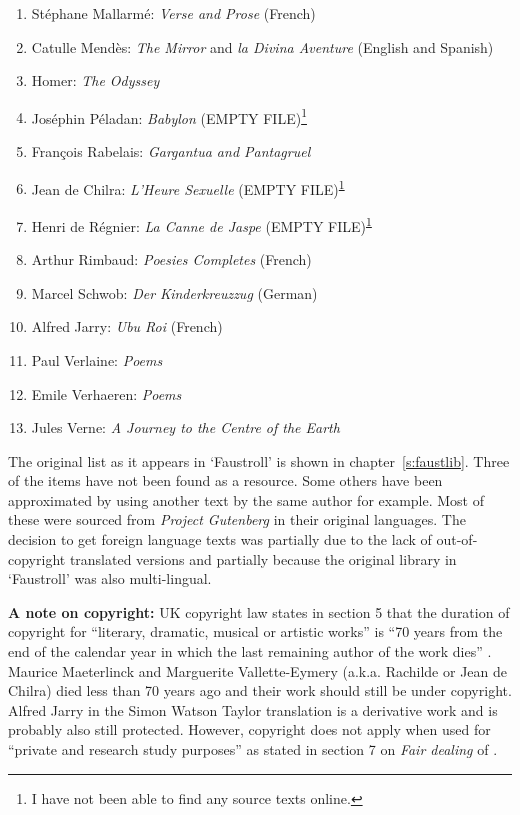 \begin{enumerate}[start=0]
\item St{\'e}phane Mallarm{\'e}: \textit{Verse and Prose} (French) \autocite*{Mallarme2003}
\item Catulle Mend{\`e}s: \textit{The Mirror} and \textit{la Divina Aventure} (English and Spanish) \autocite*{Mendes1910,Mendes2013}
\item Homer: \textit{The Odyssey} \autocite*{Homer1999}
\item Jos{\'e}phin P{\'e}ladan: \textit{Babylon} (EMPTY FILE)\footnote{I have not been able to find any source texts online.\label{emptyfile}}
\item Fran\c{c}ois Rabelais: \textit{Gargantua and Pantagruel} \autocite*{Rabelais2004}
\item Jean de Chilra: \textit{L'Heure Sexuelle} (EMPTY FILE)\textsuperscript{\ref{emptyfile}}
\item Henri de R{\'e}gnier: \textit{La Canne de Jaspe} (EMPTY FILE)\textsuperscript{\ref{emptyfile}}
\item Arthur Rimbaud: \textit{Poesies Completes} (French) \autocite*{Rimbaud2009}
\item Marcel Schwob: \textit{Der Kinderkreuzzug} (German) \autocite*{Schwob2012}
\item Alfred Jarry: \textit{Ubu Roi} (French) \autocite*{Jarry2005}
\item Paul Verlaine: \textit{Poems} \autocite*{Verlaine2009}
\item Emile Verhaeren: \textit{Poems} \autocite*{Verhaeren2010}
\item Jules Verne: \textit{A Journey to the Centre of the Earth} \autocite*{Verne2010}
\end{enumerate}

The original list as it appears in `Faustroll' is shown in chapter~\ref{s:faustlib}. Three of the items have not been found as a resource. Some others have been approximated by using another text by the same author for example. Most of these were sourced from \emph{Project Gutenberg} \autocite{Gutenberg2016} in their original languages. The decision to get foreign language texts was partially due to the lack of out-of-copyright translated versions and partially because the original library in `Faustroll' was also multi-lingual.

\textbf{A note on copyright:} UK copyright law states in section 5 that the duration of copyright for ``literary, dramatic, musical or artistic works'' is ``70 years from the end of the calendar year in which the last remaining author of the work dies'' \autocite{Copyright2015}. Maurice Maeterlinck and Marguerite Vallette-Eymery (a.k.a. Rachilde or Jean de Chilra) died less than 70 years ago and their work should still be under copyright. Alfred Jarry in the Simon Watson Taylor translation is a derivative work and is probably also still protected. However, copyright does not apply when used for ``private and research study purposes'' as stated in section 7 on \textit{Fair dealing} of \autocite{Copyright2012}.

